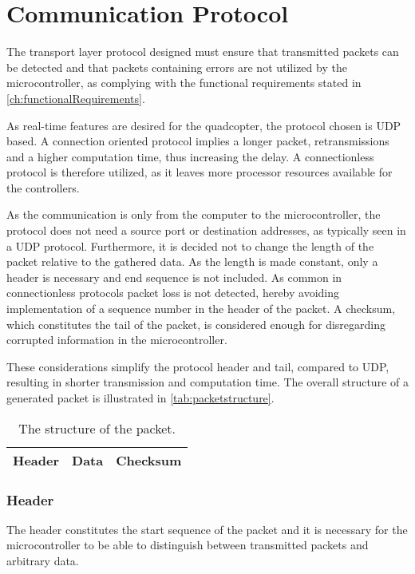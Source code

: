 \section{Communication Protocol}
The transport layer protocol designed must ensure that transmitted packets can be detected and that packets containing errors are not utilized by the microcontroller, as complying with the functional requirements stated in \autoref{ch:functionalRequirements}.

As real-time features are desired for the quadcopter, the protocol chosen is UDP based. A connection oriented protocol implies a longer packet, retransmissions and a higher computation time, thus increasing the delay. A connectionless protocol is therefore utilized, as it leaves more processor resources available for the controllers.

As the communication is only from the computer to the microcontroller, the protocol does not need a source port or destination addresses, as typically seen in a UDP protocol. Furthermore, it is decided not to change the length of the packet relative to the gathered data. As the length is made constant, only a header is necessary and end sequence is not included. As common in connectionless protocols packet loss is not detected, hereby avoiding implementation of a sequence number in the header of the packet. A checksum, which constitutes the tail of the packet, is considered enough for disregarding corrupted information in the microcontroller.

These considerations simplify the protocol header and tail, compared to UDP, resulting in shorter transmission and computation time. The overall structure of a generated packet is illustrated in \autoref{tab:packetstructure}.

\begin{table}[H]\centering
\begin{tabular}{|>{\centering\arraybackslash}m{3cm}|>{\centering\arraybackslash}m{2cm}|>{\centering\arraybackslash}m{2cm}|}
\hline
Header & Data & Checksum \\
\hline
\end{tabular}
\caption{The structure of the packet.}
\label{tab:packetstructure}
\end{table}

\subsubsection{Header}
The header constitutes the start sequence of the packet and it is necessary for the microcontroller to be able to distinguish between transmitted packets and arbitrary data. 
 
